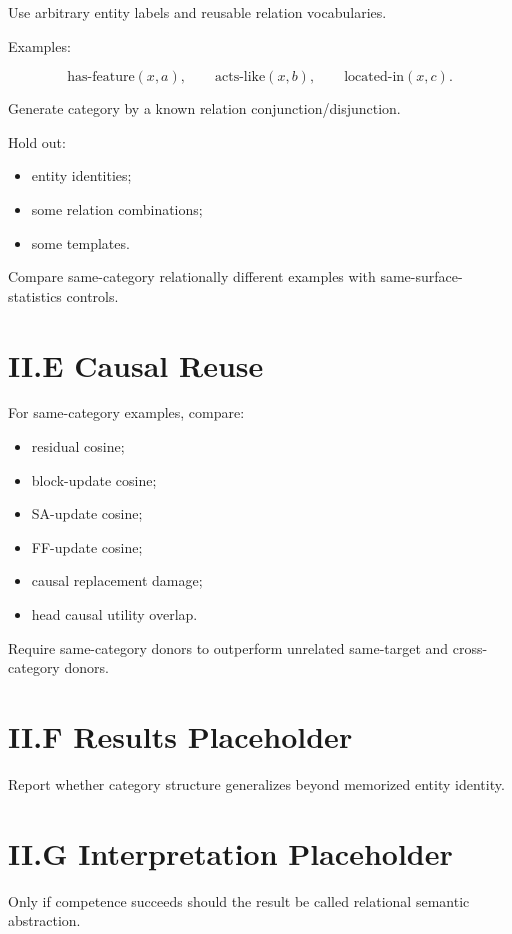\documentclass[10pt]{article}
\begin{document}
Use arbitrary entity labels and reusable relation vocabularies.

Examples:

\[
\text{has-feature}(x,a),
\qquad
\text{acts-like}(x,b),
\qquad
\text{located-in}(x,c).
\]

Generate category by a known relation conjunction/disjunction.

Hold out:

\begin{itemize}
\item entity identities;
\item some relation combinations;
\item some templates.
\end{itemize}

Compare same-category relationally different examples with same-surface-statistics controls.

\section{II.E Causal Reuse}

For same-category examples, compare:

\begin{itemize}
\item residual cosine;
\item block-update cosine;
\item SA-update cosine;
\item FF-update cosine;
\item causal replacement damage;
\item head causal utility overlap.
\end{itemize}

Require same-category donors to outperform unrelated same-target and cross-category donors.

\section{II.F Results Placeholder}

Report whether category structure generalizes beyond memorized entity identity.

\section{II.G Interpretation Placeholder}

Only if competence succeeds should the result be called relational semantic abstraction.
\end{document}
